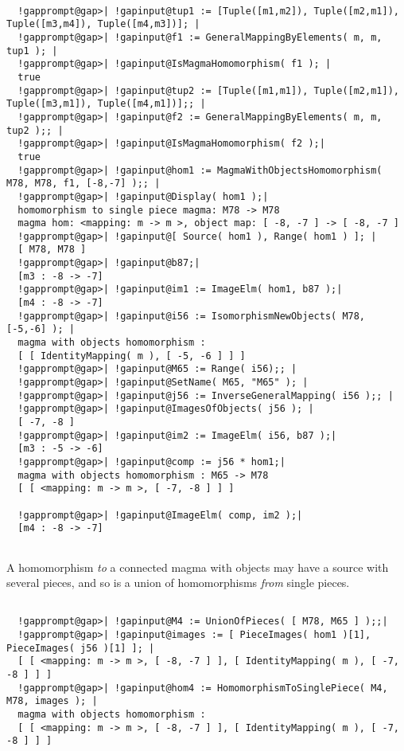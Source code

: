 \documentclass[a4paper,11pt]{report}
\begin{document}
{{{ }

 
\begin{Verbatim}[commandchars=!@|,fontsize=\small,frame=single,label=Example]
  
  !gapprompt@gap>| !gapinput@tup1 := [Tuple([m1,m2]), Tuple([m2,m1]), Tuple([m3,m4]), Tuple([m4,m3])]; |
  !gapprompt@gap>| !gapinput@f1 := GeneralMappingByElements( m, m, tup1 ); |
  !gapprompt@gap>| !gapinput@IsMagmaHomomorphism( f1 ); |
  true
  !gapprompt@gap>| !gapinput@tup2 := [Tuple([m1,m1]), Tuple([m2,m1]), Tuple([m3,m1]), Tuple([m4,m1])];; |
  !gapprompt@gap>| !gapinput@f2 := GeneralMappingByElements( m, m, tup2 );; |
  !gapprompt@gap>| !gapinput@IsMagmaHomomorphism( f2 );|
  true 
  !gapprompt@gap>| !gapinput@hom1 := MagmaWithObjectsHomomorphism( M78, M78, f1, [-8,-7] );; |
  !gapprompt@gap>| !gapinput@Display( hom1 );|
  homomorphism to single piece magma: M78 -> M78
  magma hom: <mapping: m -> m >, object map: [ -8, -7 ] -> [ -8, -7 ]
  !gapprompt@gap>| !gapinput@[ Source( hom1 ), Range( hom1 ) ]; |
  [ M78, M78 ]
  !gapprompt@gap>| !gapinput@b87;|
  [m3 : -8 -> -7]
  !gapprompt@gap>| !gapinput@im1 := ImageElm( hom1, b87 );|
  [m4 : -8 -> -7]
  !gapprompt@gap>| !gapinput@i56 := IsomorphismNewObjects( M78, [-5,-6] ); |
  magma with objects homomorphism : 
  [ [ IdentityMapping( m ), [ -5, -6 ] ] ]
  !gapprompt@gap>| !gapinput@M65 := Range( i56);; |
  !gapprompt@gap>| !gapinput@SetName( M65, "M65" ); |
  !gapprompt@gap>| !gapinput@j56 := InverseGeneralMapping( i56 );; |
  !gapprompt@gap>| !gapinput@ImagesOfObjects( j56 ); |
  [ -7, -8 ]
  !gapprompt@gap>| !gapinput@im2 := ImageElm( i56, b87 );|
  [m3 : -5 -> -6]
  !gapprompt@gap>| !gapinput@comp := j56 * hom1;|
  magma with objects homomorphism : M65 -> M78
  [ [ <mapping: m -> m >, [ -7, -8 ] ] ]
  
  !gapprompt@gap>| !gapinput@ImageElm( comp, im2 );|
  [m4 : -8 -> -7]
  
\end{Verbatim}
 A homomorphism \emph{to} a connected magma with objects may have a source with several pieces, and so
is a union of homomorphisms \emph{from} single pieces. 

 
\begin{Verbatim}[commandchars=!@|,fontsize=\small,frame=single,label=Example]
  
  !gapprompt@gap>| !gapinput@M4 := UnionOfPieces( [ M78, M65 ] );;|
  !gapprompt@gap>| !gapinput@images := [ PieceImages( hom1 )[1], PieceImages( j56 )[1] ]; |
  [ [ <mapping: m -> m >, [ -8, -7 ] ], [ IdentityMapping( m ), [ -7, -8 ] ] ]
  !gapprompt@gap>| !gapinput@hom4 := HomomorphismToSinglePiece( M4, M78, images ); |
  magma with objects homomorphism : 
  [ [ <mapping: m -> m >, [ -8, -7 ] ], [ IdentityMapping( m ), [ -7, -8 ] ] ]
  

\end{Verbatim}}}
\end{document}
